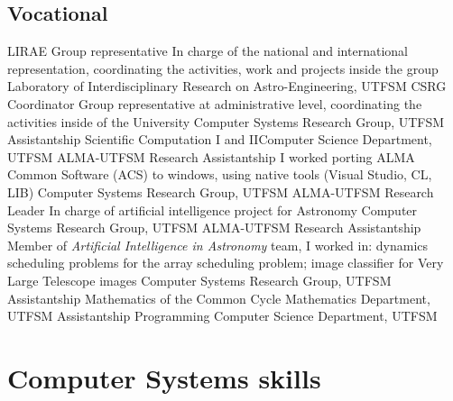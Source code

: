 \documentclass[11pt,a4paper]{moderncv}
\begin{document}
\subsection{Vocational}
	{LIRAE Group representative}
	{In charge of the national and international representation, coordinating the activities, work and projects inside the group}
	{Laboratory of Interdisciplinary Research on Astro-Engineering, UTFSM}
	{}{}
	{CSRG Coordinator}
    {Group representative at administrative level, coordinating the activities
inside of the University}
	{Computer Systems Research Group, UTFSM}
	{}{}
	{Assistantship}
	{Scientific Computation I and II}{Computer Science Department, UTFSM}
	{}{}
	{ALMA-UTFSM Research Assistantship}
    {I worked porting ALMA Common Software (ACS) to windows, using native tools (Visual Studio, CL, LIB)}
	{Computer Systems Research Group, UTFSM}
	{}{}
	{ALMA-UTFSM Research Leader}
	{In charge of artificial intelligence project for Astronomy}
	{Computer Systems Research Group, UTFSM}
	{}{}
	{ALMA-UTFSM Research Assistantship}
    {Member of \emph{Artificial Intelligence in Astronomy} team, I worked in:
dynamics scheduling problems for the array scheduling problem; image classifier
for Very Large Telescope images}
	{Computer Systems Research Group, UTFSM}
	{}{}
	{Assistantship}
	{Mathematics of the Common Cycle}
	{Mathematics Department, UTFSM}
	{}{}
	{Assistantship}
	{Programming}
	{Computer Science Department, UTFSM}
	{}{}

\section{Computer Systems skills}
\end{document}
